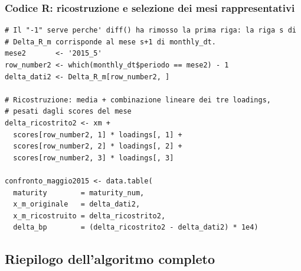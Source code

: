 \documentclass[11pt,a4paper]{article}
\theoremstyle{plain}
\theoremstyle{definition}
\theoremstyle{remark}
\begin{document}
\subsubsection{Codice R: ricostruzione e selezione dei mesi rappresentativi}

\begin{codebox}
\begin{Verbatim}[fontsize=\small]
# Il "-1" serve perche' diff() ha rimosso la prima riga: la riga s di
# Delta_R_m corrisponde al mese s+1 di monthly_dt.
mese2       <- '2015_5'
row_number2 <- which(monthly_dt$periodo == mese2) - 1
delta_dati2 <- Delta_R_m[row_number2, ]

# Ricostruzione: media + combinazione lineare dei tre loadings,
# pesati dagli scores del mese
delta_ricostrito2 <- xm +
  scores[row_number2, 1] * loadings[, 1] +
  scores[row_number2, 2] * loadings[, 2] +
  scores[row_number2, 3] * loadings[, 3]

confronto_maggio2015 <- data.table(
  maturity        = maturity_num,
  x_m_originale   = delta_dati2,
  x_m_ricostruito = delta_ricostrito2,
  delta_bp        = (delta_ricostrito2 - delta_dati2) * 1e4)
\end{Verbatim}
\end{codebox}

\subsection{Riepilogo dell'algoritmo completo}
\end{document}
